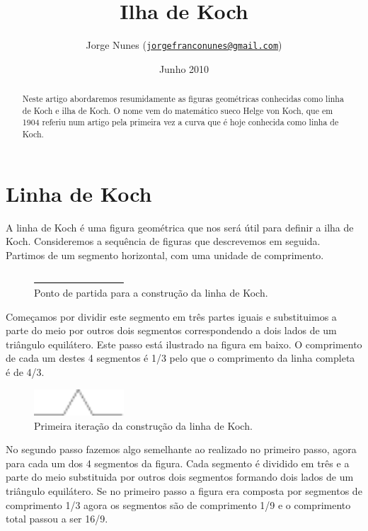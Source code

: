 \documentclass[11pt]{article}
\title{Ilha de Koch}
\author{Jorge Nunes ({\tt\href{mailto:jorgefranconunes@gmail.com}{jorgefranconunes@gmail.com}})}
\date{Junho 2010}
\begin{document}
\maketitle

\begin{abstract}
\noindent Neste artigo abordaremos resumidamente as figuras geométricas
conhecidas como linha de Koch e ilha de Koch. O nome vem do matemático
sueco Helge von Koch, que em 1904 referiu num artigo pela primeira vez
a curva que é hoje conhecida como linha de Koch.
\end{abstract}





\section{Linha de Koch}

A linha de Koch é uma figura geométrica que nos será útil para definir
a ilha de Koch. Consideremos a sequência de figuras que descrevemos em
seguida. Partimos de um segmento horizontal, com uma unidade de
comprimento.

\begin{figure}[H]
  \centering
  \includegraphics[width=0.3\textwidth]{../images/koch-line-00.pdf}
  \caption{Ponto de partida para a construção da linha de Koch.}
\end{figure}


Começamos por dividir este segmento em três partes iguais e
substituimos a parte do meio por outros dois segmentos correspondendo
a dois lados de um triângulo equilátero. Este passo está ilustrado na
figura em baixo. O comprimento de cada um destes 4 segmentos é 1/3
pelo que o comprimento da linha completa é de 4/3.

\begin{figure}[H]
  \centering
  \includegraphics[width=0.3\textwidth]{../images/koch-line-01.pdf}
  \caption{Primeira iteração da construção da linha de Koch.}
\end{figure}


No segundo passo fazemos algo semelhante ao realizado no primeiro
passo, agora para cada um dos 4 segmentos da figura. Cada segmento é
dividido em três e a parte do meio substituida por outros dois
segmentos formando dois lados de um triângulo equilátero. Se no
primeiro passo a figura era composta por segmentos de comprimento 1/3
agora os segmentos são de comprimento 1/9 e o comprimento total passou
a ser 16/9.
\end{document}
